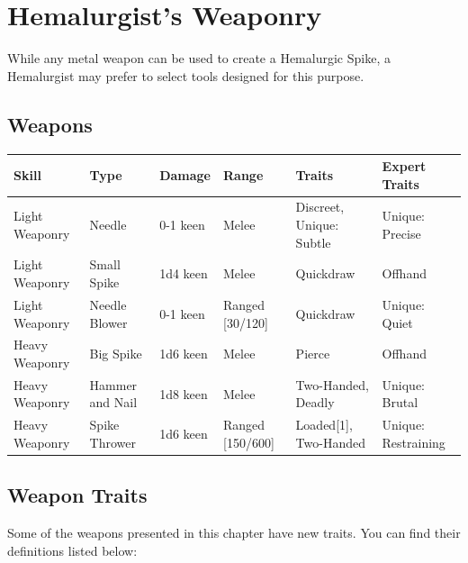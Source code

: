 \section{Hemalurgist's Weaponry}
\label{sec:hemalurgyWeapons}

While any metal weapon can be used to create a Hemalurgic Spike, a Hemalurgist may prefer to select tools designed for this purpose.



\vspace{1cm}
\subsection{Weapons}


\begin{tabular}{l l l l l l}
	Skill 
	&Type
	& Damage
	& Range
	& Traits
	& Expert Traits 
	\\ \hline 
	
	Light Weaponry
	& Needle
	& 0-1 keen
	& Melee
	& Discreet, Unique: Subtle
	& Unique: Precise
	\\
	
	Light Weaponry
	& Small Spike
	& 1d4 keen
	& Melee
	& Quickdraw
	& Offhand
	\\
	
	Light Weaponry
	& Needle Blower
	& 0-1 keen
	& Ranged [30/120]
	& Quickdraw
	& Unique: Quiet
	\\
	
	Heavy Weaponry
	& Big Spike
	& 1d6 keen
	& Melee
	& Pierce
	& Offhand
	\\
	
	Heavy Weaponry
	& Hammer and Nail
	& 1d8 keen
	& Melee
	& Two-Handed, Deadly
	& Unique: Brutal
	\\
	
	Heavy Weaponry
	& Spike Thrower
	& 1d6 keen
	& Ranged [150/600]
	& Loaded[1], Two-Handed
	& Unique: Restraining
	\\
	
	
	
\end{tabular}



\newpage


\subsection{Weapon Traits}

Some of the weapons presented in this chapter have new traits. You can find their definitions listed below: \\

